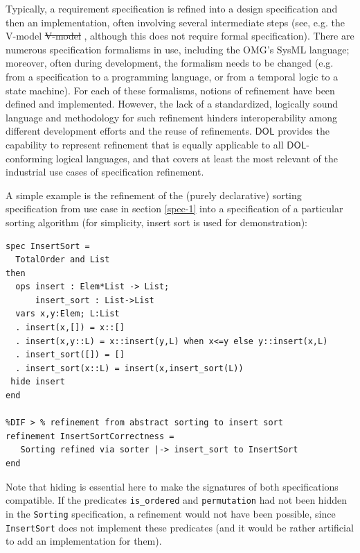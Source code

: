 \documentclass[10pt,fleqn,final]{scrreprt}
\newcommand*{\DOL}{\ensuremath{\mathsf{DOL}}\xspace}
\newenvironment{definitions}[0]{\medskip }{}
\providecommand{\DIFadd}[1]{{\protect\color{blue}\uwave{#1}}} %
\providecommand{\DIFdel}[1]{{\protect\color{red}\sout{#1}}}                      %
\providecommand{\DIFaddbegin}{} %
\providecommand{\DIFaddend}{} %
\providecommand{\DIFdelbegin}{} %
\providecommand{\DIFdelend}{} %
\begin{document}
\begin{definitions}
Typically, a requirement specification is refined into a
design specification and then an implementation, often involving
several intermediate steps (see, e.g. the V-model\DIFdelbegin %
\DIFdel{V-model}%
\DIFdelend \DIFaddbegin \DIFadd{~\mbox{%
\cite{V-model}
}%
}\DIFaddend , although
this does not require formal specification).  There are numerous
specification formalisms in use, including the OMG's SysML language;
moreover, often during development, the formalism needs to be changed
(e.g. from a specification to a programming language, or from a
temporal logic to a state machine). For each of these formalisms,
notions of refinement have been defined and implemented. However, the
lack of a standardized, logically sound language and methodology for
such refinement hinders interoperability among different development
efforts and the reuse of refinements.  \DOL provides the capability to
represent refinement that is equally applicable to all \DOL-conforming
logical languages, and that covers at least the most relevant of the
industrial use cases of specification refinement.

A simple example is the refinement of the (purely declarative) sorting
specification from use case in section \ref{spec-1} into a specification of a particular sorting
algorithm (for simplicity, insert sort is used for demonstration):

\begin{lstlisting}[basicstyle=\ttfamily\footnotesize,language=dolText,alsolanguage=CASL,escapechar=@,mathescape]	
spec InsertSort = 
  TotalOrder and List
then
  ops insert : Elem*List -> List;
      insert_sort : List->List
  vars x,y:Elem; L:List
  . insert(x,[]) = x::[]
  . insert(x,y::L) = x::insert(y,L) when x<=y else y::insert(x,L)
  . insert_sort([]) = []
  . insert_sort(x::L) = insert(x,insert_sort(L))
 hide insert
end

%DIF > % refinement from abstract sorting to insert sort
refinement InsertSortCorrectness =
   Sorting refined via sorter |-> insert_sort to InsertSort
end
\end{lstlisting}
Note that hiding is essential here to make the signatures of
both specifications compatible. If  the
predicates \texttt{is\_ordered} and \texttt{permutation}
had not been hidden in the \texttt{Sorting} specification, a refinement would
not have been possible, since \texttt{InsertSort} does not
implement these predicates (and it would be rather artificial
to add an implementation for them).


\end{definitions}
\end{document}
